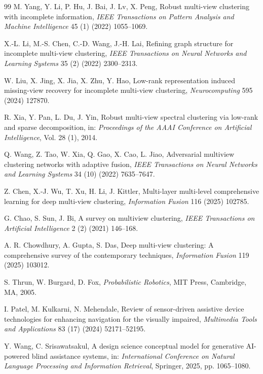 \documentclass[11pt, a4paper]{article}
\begin{document}
{{{\begin{thebibliography}{99}
M. Yang, Y. Li, P. Hu, J. Bai, J. Lv, X. Peng, Robust multi-view clustering with incomplete information, \textit{IEEE Transactions on Pattern Analysis and Machine Intelligence} 45 (1) (2022) 1055--1069.

X.-L. Li, M.-S. Chen, C.-D. Wang, J.-H. Lai, Refining graph structure for incomplete multi-view clustering, \textit{IEEE Transactions on Neural Networks and Learning Systems} 35 (2) (2022) 2300--2313.

W. Liu, X. Jing, X. Jia, X. Zhu, Y. Hao, Low-rank representation induced missing-view recovery for incomplete multi-view clustering, \textit{Neurocomputing} 595 (2024) 127870.

R. Xia, Y. Pan, L. Du, J. Yin, Robust multi-view spectral clustering via low-rank and sparse decomposition, in: \textit{Proceedings of the AAAI Conference on Artificial Intelligence}, Vol. 28 (1), 2014.

Q. Wang, Z. Tao, W. Xia, Q. Gao, X. Cao, L. Jiao, Adversarial multiview clustering networks with adaptive fusion, \textit{IEEE Transactions on Neural Networks and Learning Systems} 34 (10) (2022) 7635--7647.

Z. Chen, X.-J. Wu, T. Xu, H. Li, J. Kittler, Multi-layer multi-level comprehensive learning for deep multi-view clustering, \textit{Information Fusion} 116 (2025) 102785.

G. Chao, S. Sun, J. Bi, A survey on multiview clustering, \textit{IEEE Transactions on Artificial Intelligence} 2 (2) (2021) 146--168.

A. R. Chowdhury, A. Gupta, S. Das, Deep multi-view clustering: A comprehensive survey of the contemporary techniques, \textit{Information Fusion} 119 (2025) 103012.

S. Thrun, W. Burgard, D. Fox, \textit{Probabilistic Robotics}, MIT Press, Cambridge, MA, 2005.

I. Patel, M. Kulkarni, N. Mehendale, Review of sensor-driven assistive device technologies for enhancing navigation for the visually impaired, \textit{Multimedia Tools and Applications} 83 (17) (2024) 52171--52195.

Y. Wang, C. Srisawatsakul, A design science conceptual model for generative AI-powered blind assistance systems, in: \textit{International Conference on Natural Language Processing and Information Retrieval}, Springer, 2025, pp. 1065--1080.


\end{thebibliography}}}}
\end{document}
